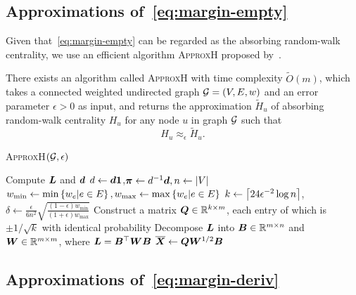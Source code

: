 \documentclass[sigconf]{acmart}
\begin{document}
\subsection{Approximations of~\eqref{eq:margin-empty}}\label{subsec:approx-margin-empty}

Given that~\eqref{eq:margin-empty} can be regarded as the absorbing random-walk centrality, we use an efficient algorithm \textsc{ApproxH} proposed by~\cite{ZhXuZh20}.
\begin{lemma}\label{lem:approxhk}
  There exists an algorithm called \textsc{ApproxH} with time complexity \(\tilde{O}(m)\), which takes a connected weighted undirected graph \(\mathcal{G}=(V,E,w)\) and an error parameter \(\epsilon>0\) as input, and returns the approximation \(\tilde{H}_u\) of absorbing random-walk centrality \(H_u\) for any node \(u\) in graph \(\mathcal{G}\) such that
  \[H_u\approx_\epsilon\tilde{H}_u.\]
\end{lemma}

\begin{algorithm}
  \caption{\textsc{ApproxH}\((\mathcal{G},\epsilon)\)}
  \label{algo:approxh}
  Compute \(\boldsymbol{L}\) and \(\boldsymbol{d}\)\;
  \(d\gets\boldsymbol{d}\boldsymbol{1}\),\(\boldsymbol{\pi}\gets d^{-1}\boldsymbol{d},n\gets\left|V \right|\)\;
  \(w_{\min}\gets\min\left\{w_e|e\in E \right\},w_{\max}\gets\max\left\{w_e|e\in E \right\}\)\;
  \(k\gets\left\lceil24\epsilon^{-2}\log n\right\rceil\),\(\delta\gets\frac{\epsilon}{6n^2}\sqrt{\frac{(1-\epsilon)w_{\min}}{(1+\epsilon)w_{\max}}}\)\;
  Construct a matrix \(\boldsymbol{Q}\in\mathbb{R}^{k\times m}\), each entry of which is \(\pm1/\sqrt k\) with identical probability\;
  Decompose \(\boldsymbol{L}\) into \(\boldsymbol{B}\in\mathbb{R}^{m\times n}\) and \(\boldsymbol{W}\in\mathbb{R}^{m\times m}\), where \(\boldsymbol{L}=\boldsymbol{B}^\top\boldsymbol{W}\boldsymbol{B}\)\;
  \(\overline{\boldsymbol{X}}\gets\boldsymbol{Q}\boldsymbol{W}^{1/2}\boldsymbol{B}\)\;

\end{algorithm}

\subsection{Approximations of~\eqref{eq:margin-deriv}}
\end{document}
